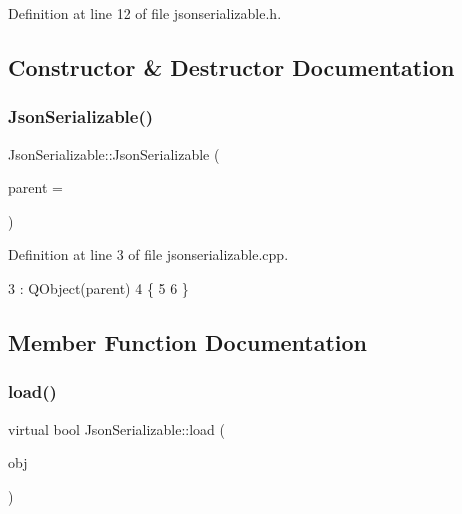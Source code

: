 Definition at line 12 of file jsonserializable.\+h.



\subsection{Constructor \& Destructor Documentation}
\mbox{\label{class_json_serializable_ab5bc08152c95bca5aad8f1a4e2c09998}} 
\subsubsection{\texorpdfstring{Json\+Serializable()}{JsonSerializable()}}
{\footnotesize\ttfamily Json\+Serializable\+::\+Json\+Serializable (\begin{DoxyParamCaption}\item[{Q\+Object $\ast$}]{parent = {} }\end{DoxyParamCaption})\hspace{0.3cm}{\ttfamily [explicit]}}



Definition at line 3 of file jsonserializable.\+cpp.


\begin{DoxyCode}
3                                                   : QObject(parent)
4 \{
5 
6 \}
\end{DoxyCode}


\subsection{Member Function Documentation}
\mbox{\label{class_json_serializable_a881aaead36cbf7d097bddfa08f204fd9}} 
\subsubsection{\texorpdfstring{load()}{load()}}
{\footnotesize\ttfamily virtual bool Json\+Serializable\+::load (\begin{DoxyParamCaption}\item[{Q\+Json\+Object}]{obj }\end{DoxyParamCaption})\hspace{0.3cm}{\ttfamily [pure virtual]}}



